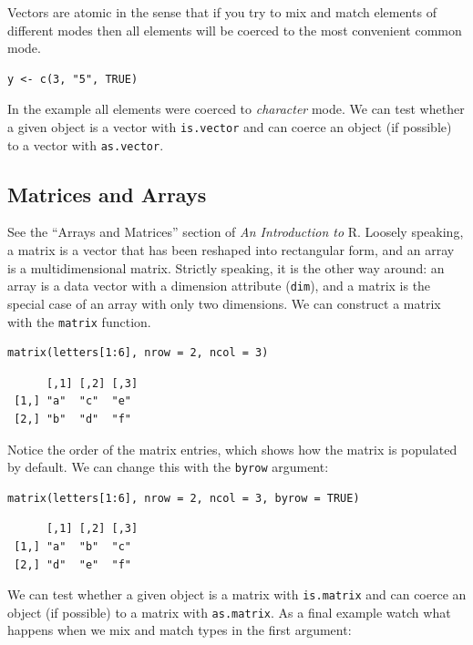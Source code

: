 \documentclass[captions=tableheading]{scrbook}
\begin{document}
Vectors are atomic in the sense that if you try to mix and match elements of different modes then all elements will be coerced to the most convenient common mode.


\begin{verbatim}
y <- c(3, "5", TRUE)
\end{verbatim}


In the example all elements were coerced to \emph{character} mode. We can test whether a given object is a vector with \texttt{is.vector} and can coerce an object (if possible) to a vector with \texttt{as.vector}.
\subsection{Matrices and Arrays}
\label{sec-20-1-2}


See the ``Arrays and Matrices'' section of \emph{An Introduction to} \textsf{R}. Loosely speaking, a matrix is a vector that has been reshaped into rectangular form, and an array is a multidimensional matrix. Strictly speaking, it is the other way around: an array is a data vector with a dimension attribute (\texttt{dim}), and a matrix is the special case of an array with only two dimensions. We can construct a matrix with the \texttt{matrix} function. 


\begin{verbatim}
matrix(letters[1:6], nrow = 2, ncol = 3)
\end{verbatim}

\begin{verbatim}
      [,1] [,2] [,3]
 [1,] "a"  "c"  "e" 
 [2,] "b"  "d"  "f"
\end{verbatim}

Notice the order of the matrix entries, which shows how the matrix is populated by default. We can change this with the \texttt{byrow} argument:


\begin{verbatim}
matrix(letters[1:6], nrow = 2, ncol = 3, byrow = TRUE)
\end{verbatim}

\begin{verbatim}
      [,1] [,2] [,3]
 [1,] "a"  "b"  "c" 
 [2,] "d"  "e"  "f"
\end{verbatim}

We can test whether a given object is a matrix with \texttt{is.matrix} and can coerce an object (if possible) to a matrix with \texttt{as.matrix}. As a final example watch what happens when we mix and match types in the first argument:
\end{document}
